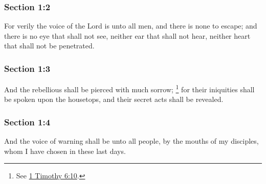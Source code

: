 	\subsubsection{Section 1:2} %
		\label{DC1-2}

		For verily the voice of the Lord is unto all men, and there is none to escape; and there is no eye that shall not see, neither ear that shall not hear, neither heart that shall not be penetrated.


	\subsubsection{Section 1:3} %
		\label{DC1-3}

		And the rebellious shall be pierced with much sorrow;%
			\footnote{%
				See \hyperref[1TIMOTHY-6-10]{1 Timothy 6:10}.
				}
		for their iniquities shall be spoken upon the housetops, and their secret acts shall be revealed.


	\subsubsection{Section 1:4} %
		\label{DC1-4}

		And the voice of warning shall be unto all people, by the mouths of my disciples, whom I have chosen in these last days.


